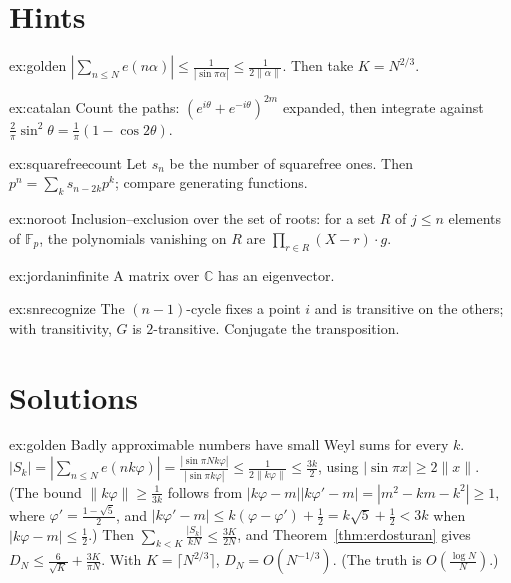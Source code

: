 \section{Hints}

\begin{hint}{ex:golden}
$|\sum_{n\le N}e(n\alpha)|\le\frac1{|\sin\pi\alpha|}\le\frac1{2\|\alpha\|}$. Then take $K=N^{2/3}$.
\end{hint}
\begin{hint}{ex:catalan}
Count the paths: $(e^{i\theta}+e^{-i\theta})^{2m}$ expanded, then integrate against $\frac2\pi\sin^2\theta=\frac1\pi(1-\cos2\theta)$.
\end{hint}
\begin{hint}{ex:squarefreecount}
Let $s_n$ be the number of squarefree ones. Then $p^n=\sum_ks_{n-2k}p^k$; compare generating functions.
\end{hint}
\begin{hint}{ex:noroot}
Inclusion--exclusion over the set of roots: for a set $R$ of $j\le n$ elements of $\mathbb F_p$, the polynomials vanishing on $R$ are $\prod_{r\in R}(X-r)\cdot g$.
\end{hint}
\begin{hint}{ex:jordaninfinite}
A matrix over $\mathbb C$ has an eigenvector.
\end{hint}
\begin{hint}{ex:snrecognize}
The $(n-1)$-cycle fixes a point $i$ and is transitive on the others; with transitivity, $G$ is $2$-transitive. Conjugate the transposition.
\end{hint}

\section{Solutions}

\begin{solution}{ex:golden}
\idea Badly approximable numbers have small Weyl sums for every $k$.
\writeup $|S_k|=|\sum_{n\le N}e(nk\varphi)|=\frac{|\sin\pi Nk\varphi|}{|\sin\pi k\varphi|}\le\frac1{2\|k\varphi\|}\le\frac{3k}2$, using $|\sin\pi x|\ge2\|x\|$. (The bound $\|k\varphi\|\ge\frac1{3k}$ follows from $|k\varphi-m||k\varphi'-m|=|m^2-km-k^2|\ge1$, where $\varphi'=\frac{1-\sqrt5}2$, and $|k\varphi'-m|\le k(\varphi-\varphi')+\frac12=k\sqrt5+\frac12<3k$ when $|k\varphi-m|\le\frac12$.) Then $\sum_{k<K}\frac{|S_k|}{kN}\le\frac{3K}{2N}$, and Theorem~\ref{thm:erdosturan} gives $D_N\le\frac6{\sqrt K}+\frac{3K}{\pi N}$. With $K=\lceil N^{2/3}\rceil$, $D_N=O(N^{-1/3})$. (The truth is $O(\frac{\log N}N)$.)
\end{solution}

